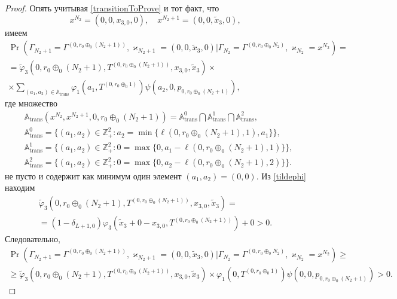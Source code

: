 \documentclass[a4paper,12pt,russian]{extarticle}
\begin{document}
\begin{proof}
Опять учитывая \eqref{transitionToProve} и тот факт, что 
\begin{equation*}
x^{N_2} = (0,0,x_{3,0},0), \quad x^{N_2+1} = (0,0,\tilde{x}_3,0),
\end{equation*}
имеем
\begin{multline*}
\Pr (\Gamma_{N_2+1}=\Gamma^{(0,r_0\oplus_{0}(N_2 + 1))},\varkappa_{N_2+1}=(0,0,\tilde{x}_3,0) | \Gamma_{N_2}=\Gamma^{(0,r_0\oplus_{0}N_2)},\varkappa_{N_2}=x^{N_2})=\\
=\widetilde{\varphi}_3(0,r_0\oplus_{0}(N_2 + 1),T^{(0,r_0\oplus_{0}(N_2 + 1))},x_{3,0},\tilde{x}_3)\times \\
\times
\sum_{(a_1,a_2)\in {\mathbb A}_{\mathrm{trans}}}\varphi_1(a_1,T^{(0,r_0\oplus_{0}1)})  \psi(a_2,0, p_{0,r_0\oplus_{0}(N_2 + 1)}),
\end{multline*}
где множество 
\begin{align*}
&{\mathbb A}_{\mathrm{trans}}(x^{N_2},x^{N_2+1},0,r_0\oplus_{0}(N_2 + 1)) = {\mathbb A}_{\mathrm{trans}}^0 \bigcap {\mathbb A}_{\mathrm{trans}}^1\bigcap {\mathbb A}_{\mathrm{trans}}^2,\\
&{\mathbb A}_{\mathrm{trans}}^0 = \{(a_1,a_2) \in \mathbb{Z}_+^2 \colon a_2 = \min{\{\ell(0,r_0\oplus_{0}(N_2 + 1),1), a_1}\} \},\\
&{\mathbb A}_{\mathrm{trans}}^1 = \{(a_1,a_2) \in \mathbb{Z}_+^2 \colon 0=\max{\{0,a_1-\ell(0,r_0\oplus_{0}(N_2 + 1),1)\}}\},\\
 &{\mathbb A}_{\mathrm{trans}}^2= \{(a_1,a_2) \in \mathbb{Z}_+^2 \colon  0=\max{\{0,a_2-\ell(0,r_0\oplus_{0}(N_2 + 1),2)\}}\}.
\end{align*}
не пусто и содержит как минимум один элемент $(a_1,a_2)=(0,0)$. Из \eqref{tildephi} находим
\begin{multline*}
\widetilde{\varphi}_3(0,r_0\oplus_{0}(N_2 + 1),T^{(0,r_0\oplus_{0}(N_2 + 1))},x_{3,0},\tilde{x}_3)=\\ = (1-\delta_{L+1,0}) \varphi_3(\tilde{x}_3 + 0 - x_{3,0},T^{(0,r_0\oplus_{0}(N_2 + 1))} ) + 0 > 0.
\end{multline*}
Следовательно, 
\begin{multline*}
\Pr (\Gamma_{N_2+1}=\Gamma^{(0,r_0\oplus_{0}(N_2 + 1))},\varkappa_{N_2+1}=(0,0,\tilde{x}_3,0) | \Gamma_{N_2}=\Gamma^{(0,r_0\oplus_{0}N_2)},\varkappa_{N_2}=x^{N_2})\geqslant\\
\geqslant \widetilde{\varphi}_3(0,r_0\oplus_{0}(N_2 + 1),T^{(0,r_0\oplus_{0}(N_2 + 1))},x_{3,0},\tilde{x}_3)
\times
\varphi_1(0,T^{(0,r_0\oplus_{0}1)}) \psi(0,0, p_{0,r_0\oplus_{0}(N_2 + 1)}) > 0.
\end{multline*}


\end{proof}
\end{document}
